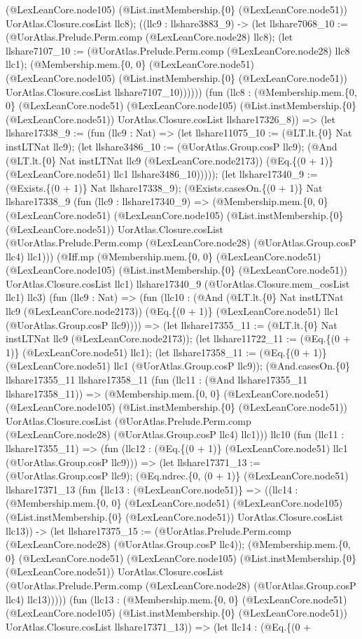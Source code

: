 \documentclass[11pt]{article}
\begin{document}
(@LexLeanCore.node105) (@List.instMembership.\{0\} (@LexLeanCore.node51)) UorAtlas.Closure.cosList llc8); ((llc9 : llshare3883\_9) -> (let llshare7068\_10 := (@UorAtlas.Prelude.Perm.comp (@LexLeanCore.node28) llc8); (let llshare7107\_10 := (@UorAtlas.Prelude.Perm.comp (@LexLeanCore.node28) llc8 llc1); (@Membership.mem.\{0, 0\} (@LexLeanCore.node51) (@LexLeanCore.node105) (@List.instMembership.\{0\} (@LexLeanCore.node51)) UorAtlas.Closure.cosList llshare7107\_10)))))) (fun (llc8 : (@Membership.mem.\{0, 0\} (@LexLeanCore.node51) (@LexLeanCore.node105) (@List.instMembership.\{0\} (@LexLeanCore.node51)) UorAtlas.Closure.cosList llshare17326\_8)) => (let llshare17338\_9 := (fun (llc9 : Nat) => (let llshare11075\_10 := (@LT.lt.\{0\} Nat instLTNat llc9); (let llshare3486\_10 := (@UorAtlas.Group.cosP llc9); (@And (@LT.lt.\{0\} Nat instLTNat llc9 (@LexLeanCore.node2173)) (@Eq.\{(0 + 1)\} (@LexLeanCore.node51) llc1 llshare3486\_10))))); (let llshare17340\_9 := (@Exists.\{(0 + 1)\} Nat llshare17338\_9); (@Exists.casesOn.\{(0 + 1)\} Nat llshare17338\_9 (fun (llc9 : llshare17340\_9) => (@Membership.mem.\{0, 0\} (@LexLeanCore.node51) (@LexLeanCore.node105) (@List.instMembership.\{0\} (@LexLeanCore.node51)) UorAtlas.Closure.cosList (@UorAtlas.Prelude.Perm.comp (@LexLeanCore.node28) (@UorAtlas.Group.cosP llc4) llc1))) (@Iff.mp (@Membership.mem.\{0, 0\} (@LexLeanCore.node51) (@LexLeanCore.node105) (@List.instMembership.\{0\} (@LexLeanCore.node51)) UorAtlas.Closure.cosList llc1) llshare17340\_9 (@UorAtlas.Closure.mem\_cosList llc1) llc3) (fun (llc9 : Nat) => (fun (llc10 : (@And (@LT.lt.\{0\} Nat instLTNat llc9 (@LexLeanCore.node2173)) (@Eq.\{(0 + 1)\} (@LexLeanCore.node51) llc1 (@UorAtlas.Group.cosP llc9)))) => (let llshare17355\_11 := (@LT.lt.\{0\} Nat instLTNat llc9 (@LexLeanCore.node2173)); (let llshare11722\_11 := (@Eq.\{(0 + 1)\} (@LexLeanCore.node51) llc1); (let llshare17358\_11 := (@Eq.\{(0 + 1)\} (@LexLeanCore.node51) llc1 (@UorAtlas.Group.cosP llc9)); (@And.casesOn.\{0\} llshare17355\_11 llshare17358\_11 (fun (llc11 : (@And llshare17355\_11 llshare17358\_11)) => (@Membership.mem.\{0, 0\} (@LexLeanCore.node51) (@LexLeanCore.node105) (@List.instMembership.\{0\} (@LexLeanCore.node51)) UorAtlas.Closure.cosList (@UorAtlas.Prelude.Perm.comp (@LexLeanCore.node28) (@UorAtlas.Group.cosP llc4) llc1))) llc10 (fun (llc11 : llshare17355\_11) => (fun (llc12 : (@Eq.\{(0 + 1)\} (@LexLeanCore.node51) llc1 (@UorAtlas.Group.cosP llc9))) => (let llshare17371\_13 := (@UorAtlas.Group.cosP llc9); (@Eq.ndrec.\{0, (0 + 1)\} (@LexLeanCore.node51) llshare17371\_13 (fun \{llc13 : (@LexLeanCore.node51)\} => ((llc14 : (@Membership.mem.\{0, 0\} (@LexLeanCore.node51) (@LexLeanCore.node105) (@List.instMembership.\{0\} (@LexLeanCore.node51)) UorAtlas.Closure.cosList llc13)) -> (let llshare17375\_15 := (@UorAtlas.Prelude.Perm.comp (@LexLeanCore.node28) (@UorAtlas.Group.cosP llc4)); (@Membership.mem.\{0, 0\} (@LexLeanCore.node51) (@LexLeanCore.node105) (@List.instMembership.\{0\} (@LexLeanCore.node51)) UorAtlas.Closure.cosList (@UorAtlas.Prelude.Perm.comp (@LexLeanCore.node28) (@UorAtlas.Group.cosP llc4) llc13))))) (fun (llc13 : (@Membership.mem.\{0, 0\} (@LexLeanCore.node51) (@LexLeanCore.node105) (@List.instMembership.\{0\} (@LexLeanCore.node51)) UorAtlas.Closure.cosList llshare17371\_13)) => (let llc14 : (@Eq.\{(0 + 
\end{document}
